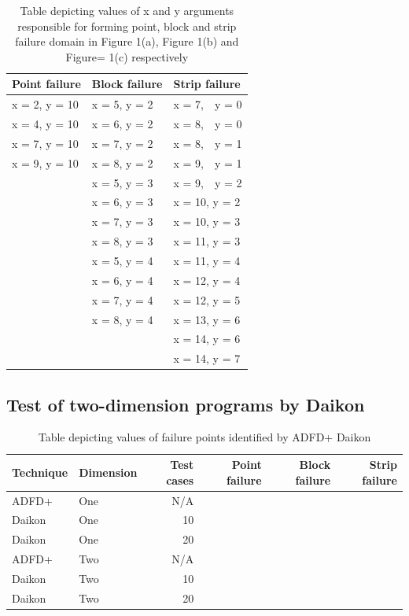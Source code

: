 \begin{table}[h]
\caption{Table depicting values of x and y arguments responsible for forming point, block and strip failure domain in Figure 1(a), Figure 1(b) and Figure= 1(c) respectively}
\bigskip
\centering
{\renewcommand{\arraystretch}{1.3}
\begin{tabular}{|l|l|l|}
\hline
Point failure		& 	Block failure		& 	Strip failure		\\
\hline
x = 2, y = 10	&	x = 5, y = 2		&	x = 7,~~y = 0	\\	
x = 4, y = 10	&	x = 6, y = 2		&	x = 8,~~y = 0	\\	
x = 7, y = 10	&	x = 7, y = 2		&	x = 8,~~y = 1	\\
x = 9, y = 10	& 	x = 8, y = 2 		& 	x = 9,~~y = 1	\\
				& 	x = 5, y = 3 		& 	x = 9,~~y = 2	\\
				& 	x = 6, y = 3 		& 	x = 10, y = 2	\\
				& 	x = 7, y = 3 		& 	x = 10, y = 3	\\
				& 	x = 8, y = 3 		& 	x = 11, y = 3	\\
				& 	x = 5, y = 4 		& 	x = 11, y = 4	\\
				& 	x = 6, y = 4 		& 	x = 12, y = 4	\\
				& 	x = 7, y = 4 		& 	x = 12, y = 5	\\
				& 	x = 8, y = 4 		& 	x = 13, y = 6	\\
				&			      		& 	x = 14, y = 6	\\				
				&			      		& 	x = 14, y = 7	\\
\hline
\end{tabular}
}
\bigskip
\label{table:failureDomains}
\end{table}

\subsection{Test of two-dimension programs by Daikon}\label{sec:intro6_12}





\begin{table}[ht]
\caption{Table depicting values of failure points identified by ADFD+ Daikon}
\bigskip
\centering
{\renewcommand{\arraystretch}{1.3}
\begin{tabular}{|l|l|r|r|r|r|}
\hline
Technique 	& Dimension	& Test cases		& 	Point failure		& 	Block failure	& 	Strip failure	\\
\hline
ADFD+		& 	One				& N/A			& 					& 				&				\\
Daikon		& 	One				& 10			&					&				&				\\
Daikon		& 	One				& 20			&					&				&				\\
ADFD+		& 	Two				& N/A			&					&				&				\\
Daikon		& 	Two				& 10			&					&				&				\\
Daikon		& 	Two				& 20			&					&				&				\\
\hline
\end{tabular}
}
\bigskip
\label{table:results}
\end{table}




